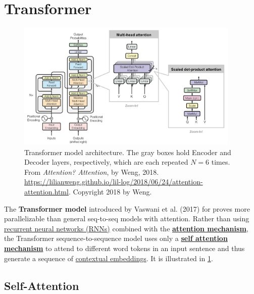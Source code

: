 \section{Transformer} \label{sec:Transformer}

\begin{figure}[h]
\vspace{-10pt}
\centering
\includegraphics[width=0.95\textwidth]{imgs/transformer.png}
\vspace{-10pt}
\caption{\footnotesize Transformer model architecture. The gray boxes hold Encoder and Decoder layers, respectively, which are each repeated $N=6$ times. From \emph{Attention? Attention}, by Weng, 2018. \url{https://lilianweng.github.io/lil-log/2018/06/24/attention-attention.html}. Copyright 2018 by Weng.}
\vspace{-5pt}
\label{fig:transformer}
\end{figure}

The \textbf{Transformer model} introduced by Vaswani et al. (2017) for  proves more parallelizable than general seq-to-seq models with attention. Rather than using \hyperref[sec:RNN]{ recurrent neural networks (RNNs)} combined with the \textbf{\hyperref[sec:AttentionMechanism]{attention mechanism}}, the Transformer sequence-to-sequence model uses only a \textbf{\hyperref[sec:SelfAttention]{self attention mechanism}} to attend to different word tokens in an input sentence and thus generate a sequence of \hyperref[sec:SolutionWithContextEmbs]{contextual embeddings}. It is illustrated in \cref{fig:transformer}.




\subsection{Self-Attention} \label{sec:SelfAttention}

